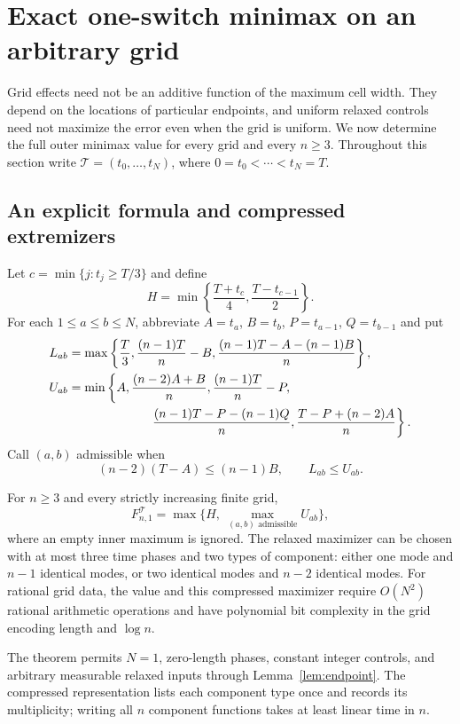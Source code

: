 \section{Exact one-switch minimax on an arbitrary grid}\label{sec:finite-one}
Grid effects need not be an additive function of the maximum cell width.
They depend on the locations of particular endpoints, and uniform relaxed
controls need not maximize the error even when the grid is uniform.
We now determine the full outer minimax value for every grid and every
$n\ge3$. Throughout this section write
$\mathcal T=(t_0,\ldots,t_N)$, where $0=t_0<\cdots<t_N=T$.

\subsection{An explicit formula and compressed extremizers}
Let $c=\min\{j:t_j\ge T/3\}$ and define
\begin{equation}\label{eq:grid-H}
 H=\min\left\{\frac{T+t_c}{4},\frac{T-t_{c-1}}2\right\}.
\end{equation}
For each $1\le a\le b\le N$, abbreviate
$A=t_a$, $B=t_b$, $P=t_{a-1}$, $Q=t_{b-1}$ and put
\begin{align}
 L_{ab}&=\max\left\{\frac T3,\frac{(n-1)T}{n}-B,
                \frac{(n-1)T-A-(n-1)B}{n}\right\},\label{eq:grid-L}\\
 U_{ab}&=\min\left\{A,\frac{(n-2)A+B}{n},\frac{(n-1)T}{n}-P,\right.\notag\\
 &\hspace{23mm}\left.\frac{(n-1)T-P-(n-1)Q}{n},
          \frac{T-P+(n-2)A}{n}\right\}.\label{eq:grid-U}
\end{align}
Call $(a,b)$ admissible when
\begin{equation}\label{eq:grid-admissible}
 (n-2)(T-A)\le(n-1)B,\qquad L_{ab}\le U_{ab}.
\end{equation}

\begin{theorem}\label{thm:finite-one}
For $n\ge3$ and every strictly increasing finite grid,
\begin{equation}\label{eq:grid-minimax-formula}
 F^{\mathcal T}_{n,1}=\max\{H,\ \max_{(a,b)\text{ admissible}}U_{ab}\},
\end{equation}
where an empty inner maximum is ignored. The relaxed maximizer can be chosen
with at most three time phases and two types of component: either one
mode and $n-1$ identical modes, or two identical modes and $n-2$ identical
modes. For rational grid data, the value and this compressed maximizer
require $O(N^2)$ rational arithmetic operations and have polynomial bit
complexity in the grid encoding length and $\log n$.
\end{theorem}
The theorem permits $N=1$, zero-length phases, constant integer controls,
and arbitrary measurable relaxed inputs through Lemma~\ref{lem:endpoint}.
The compressed representation lists each component type once and records its
multiplicity; writing all $n$ component functions takes at least linear time
in $n$.

